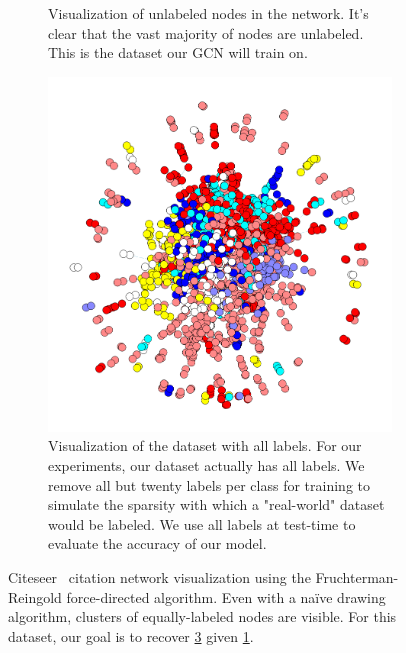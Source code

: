 \begin{figure}
\begin{subfigure}{0.32\textwidth}
		\caption{Visualization of unlabeled nodes in the network. It's clear that the vast majority of nodes are unlabeled. This is the dataset our GCN will train on.} %
        \label{fig:dataset_train}
	\end{subfigure}
	\vspace{1em} %
    \begin{subfigure}{0.32\textwidth} %
		\includegraphics[width=\textwidth]{media/labels_all.png}
        \caption{Visualization of the dataset with all labels. For our experiments, our dataset actually has all labels. We remove all but twenty labels per class for training to simulate the sparsity with which a "real-world" dataset would be labeled. We use all labels at test-time to evaluate the accuracy of our model.} %
        \label{fig:dataset_all}
	\end{subfigure}
	\caption{Citeseer~\cite{DBLP:journals/corr/YangCS16} citation network visualization using the Fruchterman-Reingold force-directed algorithm. Even with a na\"ive drawing algorithm, clusters of equally-labeled nodes are visible. For this dataset, our goal is to recover \ref{fig:dataset_all} given \ref{fig:dataset_train}.} %
\end{figure}


